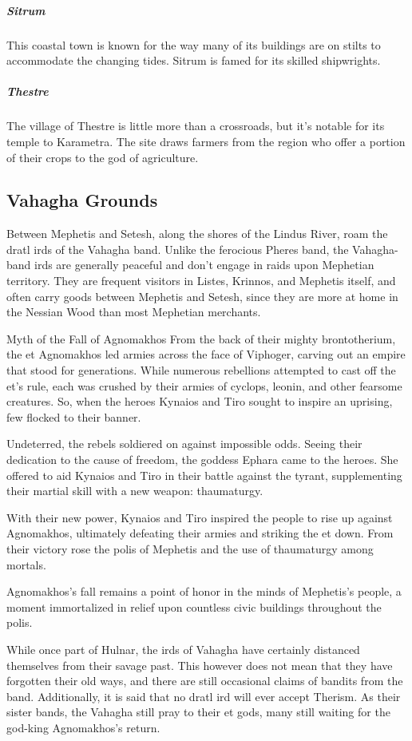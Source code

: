         \subparagraph{Sitrum} This coastal town is known for the way many of its buildings are on stilts to accommodate the changing tides.
        Sitrum is famed for its skilled shipwrights.

        \subparagraph{Thestre} The village of Thestre is little more than a crossroads, but it's notable for its temple to Karametra.
        The site draws farmers from the region who offer a portion of their crops to the god of agriculture.

\subsection*{Vahagha Grounds}
    Between Mephetis and Setesh, along the shores of the Lindus River, roam the dratl irds of the Vahagha band.
    Unlike the ferocious Pheres band, the Vahagha-band irds are generally peaceful and don't engage in raids upon Mephetian territory.
    They are frequent visitors in Listes, Krinnos, and Mephetis itself, and often carry goods between Mephetis and Setesh, since they are more at home in the Nessian Wood than most Mephetian merchants.

    \begin{DndComment}[float=t]{Myth of the Fall of Agnomakhos}
        From the back of their mighty brontotherium, the et Agnomakhos led armies across the face of Viphoger, carving out an empire that stood for generations.
        While numerous rebellions attempted to cast off the et's rule, each was crushed by their armies of cyclops, leonin, and other fearsome creatures.
        So, when the heroes Kynaios and Tiro sought to inspire an uprising, few flocked to their banner.

        Undeterred, the rebels soldiered on against impossible odds.
        Seeing their dedication to the cause of freedom, the goddess Ephara came to the heroes.
        She offered to aid Kynaios and Tiro in their battle against the tyrant, supplementing their martial skill with a new weapon: thaumaturgy.

        With their new power, Kynaios and Tiro inspired the people to rise up against Agnomakhos, ultimately defeating their armies and striking the et down.
        From their victory rose the polis of Mephetis and the use of thaumaturgy among mortals.

        Agnomakhos's fall remains a point of honor in the minds of Mephetis's people, a moment immortalized in relief upon countless civic buildings throughout the polis.
    \end{DndComment}

    While once part of Hulnar, the irds of Vahagha have certainly distanced themselves from their savage past.
    This however does not mean that they have forgotten their old ways, and there are still occasional claims of bandits from the band.
    Additionally, it is said that no dratl ird will ever accept Therism.
    As their sister bands, the Vahagha still pray to their et gods, many still waiting for the god-king Agnomakhos's return.

\pagebreak
